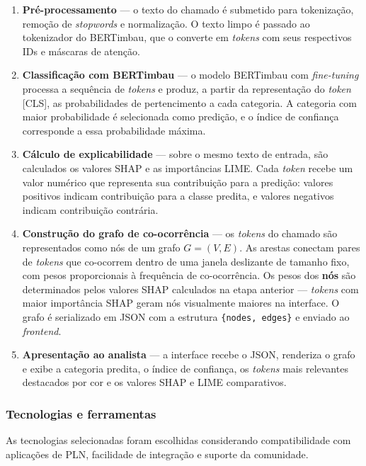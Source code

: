\documentclass[
    12pt,                %
    openright,           %
    oneside,             %
    a4paper,             %
    english,             %
    brazil               %
]{abntex2}
\begin{document}
\begin{enumerate}
    \item \textbf{Pré-processamento} — o texto do chamado é submetido para tokenização, remoção de \textit{stopwords} e normalização. O texto limpo é passado ao tokenizador do BERTimbau, que o converte em \textit{tokens} com seus respectivos IDs e máscaras de atenção.

    \item \textbf{Classificação com BERTimbau} — o modelo BERTimbau com \textit{fine-tuning} processa a sequência de \textit{tokens} e produz, a partir da representação do \textit{token} [CLS], as probabilidades de pertencimento a cada categoria. A categoria com maior probabilidade é selecionada como predição, e o índice de confiança corresponde a essa probabilidade máxima.

    \item \textbf{Cálculo de explicabilidade} — sobre o mesmo texto de entrada, são calculados os valores SHAP e as importâncias LIME. Cada \textit{token} recebe um valor numérico que representa sua contribuição para a predição: valores positivos indicam contribuição para a classe predita, e valores negativos indicam contribuição contrária.

    \item \textbf{Construção do grafo de co-ocorrência} — os \textit{tokens} do chamado são representados como nós de um grafo $G = (V, E)$. As arestas conectam pares de \textit{tokens} que co-ocorrem dentro de uma janela deslizante de tamanho fixo, com pesos proporcionais à frequência de co-ocorrência. Os pesos dos \textbf{nós} são determinados pelos valores SHAP calculados na etapa anterior — \textit{tokens} com maior importância SHAP geram nós visualmente maiores na interface. O grafo é serializado em JSON com a estrutura \texttt{\{nodes, edges\}} e enviado ao \textit{frontend}.

    \item \textbf{Apresentação ao analista} — a interface recebe o JSON, renderiza o grafo e exibe a categoria predita, o índice de confiança, os \textit{tokens} mais relevantes destacados por cor e os valores SHAP e LIME comparativos.
\end{enumerate}

\subsubsection{Tecnologias e ferramentas}

As tecnologias selecionadas foram escolhidas considerando compatibilidade com aplicações de PLN, facilidade de integração e suporte da comunidade.
\end{document}
